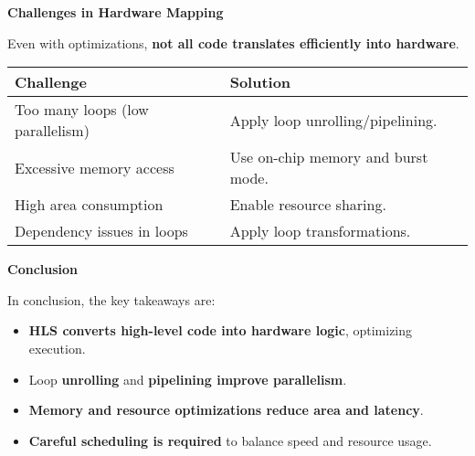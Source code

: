 \highspace
\begin{flushleft}
    \textcolor{Red2}{ \textbf{Challenges in Hardware Mapping}}
\end{flushleft}
Even with optimizations, \textbf{not all code translates efficiently into hardware}.
\begin{table}[!htp]
    \centering
    \begin{tabular}{@{} l l @{}}
        \toprule
        \textbf{Challenge} & \textbf{Solution} \\
        \midrule
        Too many loops (low parallelism)    & Apply loop unrolling/pipelining. \\
        \cmidrule{1-2}
        Excessive memory access             & Use on-chip memory and burst mode. \\
        \cmidrule{1-2}
        High area consumption               & Enable resource sharing. \\
        \cmidrule{1-2}
        Dependency issues in loops          & Apply loop transformations. \\
        \bottomrule
    \end{tabular}
\end{table}

\highspace
\begin{flushleft}
    \textcolor{Green3}{ \textbf{Conclusion}}
\end{flushleft}
In conclusion, the key takeaways are:
\begin{itemize}
    \item \textbf{HLS converts high-level code into hardware logic}, optimizing execution.
    \item Loop \textbf{unrolling} and \textbf{pipelining improve parallelism}.
    \item \textbf{Memory and resource optimizations reduce area and latency}.
    \item \textbf{Careful scheduling is required} to balance speed and resource usage.
\end{itemize}
